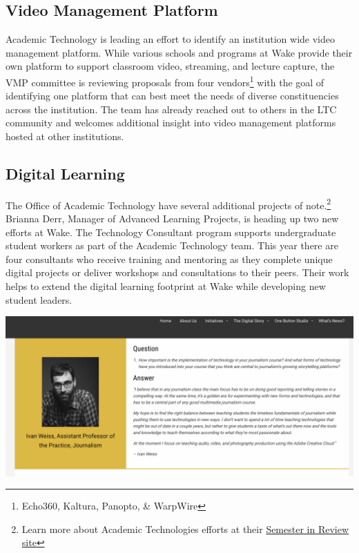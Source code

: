 \documentclass[]{tufte-handout}
\begin{document}
\subsection{Video Management Platform}\label{video-management-platform}

Academic Technology is leading an effort to identify an institution wide
video management platform. While various schools and programs at Wake
provide their own platform to support classroom video, streaming, and
lecture capture, the VMP committee is reviewing proposals from four
vendors\footnote{Echo360, Kaltura, Panopto, \& WarpWire} with the goal
of identifying one platform that can best meet the needs of diverse
constituencies across the institution. The team has already reached out
to others in the LTC community and welcomes additional insight into
video management platforms hosted at other institutions.

\subsection{Digital Learning}\label{digital-learning}

The Office of Academic Technology have several additional projects of
note.\footnote{Learn more about Academic Technologies efforts at their
  \href{https://spark.adobe.com/page/356WBwoJHJCp2/}{Semester in Review
  site}} Brianna Derr, Manager of Advanced Learning Projects, is heading
up two new efforts at Wake. The Technology Consultant program supports
undergraduate student workers as part of the Academic Technology team.
This year there are four consultants who receive training and mentoring
as they complete unique digital projects or deliver workshops and
consultations to their peers. Their work helps to extend the digital
learning footprint at Wake while developing new student leaders.

\begin{marginfigure}
\includegraphics[width=20.83in]{images/weiss} \end{marginfigure}
\end{document}
